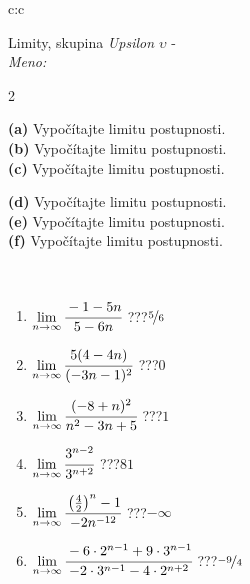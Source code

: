 \documentclass[10pt]{report}
\begin{document}
\newpage
\thispagestyle{empty}
\begin{tabular}{c:c}
\begin{minipage}[c][104.5mm][t]{0.5\linewidth}
\begin{center}
\vspace{5mm}
{\huge Limity, skupina \textit{Upsilon $\upsilon$} -}\\[5mm]
\textit{Meno:}\phantom{xxxxxxxxxxxxxxxxxxxxxxxxxxxxxxxxxxxxxxxxxxxxxxxxxxxxxxxxxxxxxxxxx}\\[5mm]
\begin{minipage}{0.95\linewidth}
\begin{center}
{\small \begin{multicols}{2} \raggedright
\textbf{(a)} Vypočítajte limitu postupnosti. \\[1mm]
\textbf{(b)} Vypočítajte limitu postupnosti. \\[1mm]
\textbf{(c)} Vypočítajte limitu postupnosti. \par \columnbreak
\textbf{(d)} Vypočítajte limitu postupnosti. \\[1mm]
\textbf{(e)} Vypočítajte limitu postupnosti. \\[1mm]
\textbf{(f)} Vypočítajte limitu postupnosti.
\end{multicols}
}
\end{center}
\end{minipage}
\\[1mm]
\begin{minipage}{0.79\linewidth}
\begin{center}
\begin{varwidth}{\linewidth}
\setlength{\itemsep}{0pt}
\begin{enumerate}
\footnotesizerr
\item $\lim\limits_{n\to\infty}\cfrac{-1-5n}{5-6n}$\quad \dotfill\; ???\;\dotfill \quad $\nicefrac{5}{6}$
\item $\lim\limits_{n\to\infty}\cfrac{5(4-4n)}{(-3n-1)^2}$\quad \dotfill\; ???\;\dotfill \quad $0$
\item $\lim\limits_{n\to\infty}\cfrac{(-8+n)^2}{n^2-3n+5}$\quad \dotfill\; ???\;\dotfill \quad $1$
\item $\lim\limits_{n\to\infty}\cfrac{3^{n-2}}{3^{n+2}}$\quad \dotfill\; ???\;\dotfill \quad $81$
\item $\lim\limits_{n\to\infty}\cfrac{\left(\frac{4}{2}\right)^n -1}{-2n^{-12}}$\quad \dotfill\; ???\;\dotfill \quad $-\infty$
\item $\lim\limits_{n\to\infty}\cfrac{-6\cdot 2^{n-1}+9\cdot 3^{n-1}}{-2\cdot 3^{n-1}-4\cdot 2^{n+2}}$\quad \dotfill\; ???\;\dotfill \quad $\nicefrac{-9}{4}$

\end{enumerate}
\end{varwidth}
\end{center}
\end{minipage}
\end{center}
\end{minipage}
\end{tabular}
\end{document}

